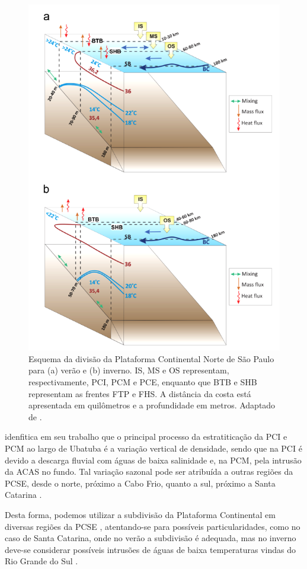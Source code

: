 \begin{figure}[!h]
    \centering
    \includegraphics[width=0.65\linewidth]{figuras/divisao_PCNSP.png}
\caption[Divisão da Plataforma Continental de São Paulo]{Esquema da divisão da Plataforma Continental Norte de São Paulo para (a) verão e (b) inverno. IS, MS e OS representam, respectivamente, PCI, PCM e PCE, enquanto que BTB e SHB representam as frentes FTP e FHS. A distância da costa está apresentada em quilômetros e a profundidade em metros. Adaptado de \citep{castro2014summer}.}
    \label{fig:pcnsp}
\end{figure}

\hspace{5mm} \cite{castro2014summer} idenfitica em seu trabalho que o principal processo da estratiticação da PCI e PCM ao largo de Ubatuba é a variação vertical de densidade, sendo que na PCI é devido a descarga fluvial com águas de baixa salinidade e, na PCM, pela intrusão da ACAS no fundo. Tal variação sazonal pode ser atribuída a outras regiões da PCSE, desde o norte, próximo a Cabo Frio, quanto a sul, próximo a Santa Catarina \citep{cerda2014,brandini2014deep,nogueira2013distribution}.

\hspace{5mm} Desta forma, podemos utilizar a subdivisão da Plataforma Continental em diversas regiões da PCSE \citep{de2003intrusoes,cerda2014}, atentando-se para possíveis particularidades, como no caso de Santa Catarina, onde no verão a subdivisão é adequada, mas no inverno deve-se considerar possíveis intrusões de águas de baixa temperaturas vindas do Rio Grande do Sul \citep{carvalho2010estrutura}.

